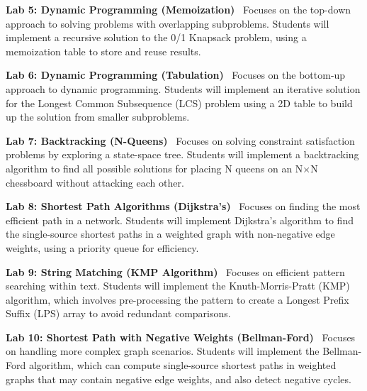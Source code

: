 \noindent\textbf{Lab 5: Dynamic Programming (Memoization)} \
Focuses on the top-down approach to solving problems with overlapping subproblems. Students will implement a recursive solution to the 0/1 Knapsack problem, using a memoization table to store and reuse results. \\

\vspace{0.2cm}

\noindent\textbf{Lab 6: Dynamic Programming (Tabulation)} \
Focuses on the bottom-up approach to dynamic programming. Students will implement an iterative solution for the Longest Common Subsequence (LCS) problem using a 2D table to build up the solution from smaller subproblems. \\

\vspace{0.2cm}

\noindent\textbf{Lab 7: Backtracking (N-Queens)} \
Focuses on solving constraint satisfaction problems by exploring a state-space tree. Students will implement a backtracking algorithm to find all possible solutions for placing N queens on an N×N chessboard without attacking each other. \\

\vspace{0.2cm}

\noindent\textbf{Lab 8: Shortest Path Algorithms (Dijkstra's)} \
Focuses on finding the most efficient path in a network. Students will implement Dijkstra's algorithm to find the single-source shortest paths in a weighted graph with non-negative edge weights, using a priority queue for efficiency. \\

\vspace{0.2cm}

\noindent\textbf{Lab 9: String Matching (KMP Algorithm)} \
Focuses on efficient pattern searching within text. Students will implement the Knuth-Morris-Pratt (KMP) algorithm, which involves pre-processing the pattern to create a Longest Prefix Suffix (LPS) array to avoid redundant comparisons. \\

\vspace{0.2cm}

\noindent\textbf{Lab 10: Shortest Path with Negative Weights (Bellman-Ford)} \
Focuses on handling more complex graph scenarios. Students will implement the Bellman-Ford algorithm, which can compute single-source shortest paths in weighted graphs that may contain negative edge weights, and also detect negative cycles.

\newpage
{}
